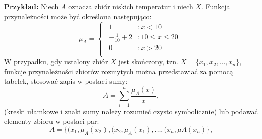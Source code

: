 \documentclass[a4paper,12pt]{article}
\theoremstyle{definition}
\begin{document}
\medskip
\noindent
{\bf Przykład:} Niech $A$ oznacza zbiór niskich temperatur i niech $X$. Funkcja przynależności może być określona następująco:
\begin{equation}
\mu_{A}=\begin{cases} \begin{array}{ll}
1 & \colon x<10\\
-\frac{1}{10}+2 &\colon10\leq x \leq 20\\
0 & \colon x>20\\
\end{array}
\end{cases}
\end{equation}
W przypadku, gdy ustalony zbiór $X$ jest skończony, tzn. $X=\{x_{1},x_{2},\dots,x_{n}\}$, funkcje przynależności zbiorów rozmytych można przedstawiać za pomocą tabelek, stosować zapis w postaci sumy:
\begin{equation}
A=\sum_{i=1}^{n}\frac{\mu_{A}(x)}{x},
\end{equation}
(kreski ułamkowe i znaki sumy należy rozumieć czysto symbolicznie) lub podawać elementy zbioru w postaci par:
\begin{equation}
A=\{(x_{1},\mu_{A}(x_{2}),(x_{2},\mu_{A}(x_{1}),\dots,(x_{n},\mu{A}(x_{n})\},
\end{equation}
\end{document}
